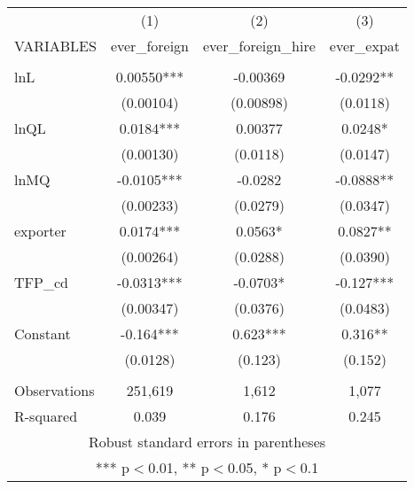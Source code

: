 \documentclass[]{article}
\begin{document}
\begin{tabular}{lccc} \hline
 & (1) & (2) & (3) \\
VARIABLES & ever\_foreign & ever\_foreign\_hire & ever\_expat \\ \hline
 &  &  &  \\
lnL & 0.00550*** & -0.00369 & -0.0292** \\
 & (0.00104) & (0.00898) & (0.0118) \\
lnQL & 0.0184*** & 0.00377 & 0.0248* \\
 & (0.00130) & (0.0118) & (0.0147) \\
lnMQ & -0.0105*** & -0.0282 & -0.0888** \\
 & (0.00233) & (0.0279) & (0.0347) \\
exporter & 0.0174*** & 0.0563* & 0.0827** \\
 & (0.00264) & (0.0288) & (0.0390) \\
TFP\_cd & -0.0313*** & -0.0703* & -0.127*** \\
 & (0.00347) & (0.0376) & (0.0483) \\
Constant & -0.164*** & 0.623*** & 0.316** \\
 & (0.0128) & (0.123) & (0.152) \\
 &  &  &  \\
Observations & 251,619 & 1,612 & 1,077 \\
 R-squared & 0.039 & 0.176 & 0.245 \\ \hline
\multicolumn{4}{c}{ Robust standard errors in parentheses} \\
\multicolumn{4}{c}{ *** p$<$0.01, ** p$<$0.05, * p$<$0.1} \\
\end{tabular}
\end{document}
